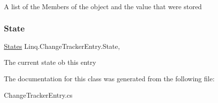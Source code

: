 A list of the Members of the object and the value that were stored 

\mbox{\label{class_linq_1_1_change_tracker_entry_ad24e8722ffd29eccfdcd3a72c97b1957}} 
\subsubsection{\texorpdfstring{State}{State}}
{\footnotesize\ttfamily \mbox{\hyperlink{class_linq_1_1_change_tracker_entry_aded3f97a3bd1326ae1b264c7618b7828}{States}} Linq.\+Change\+Tracker\+Entry.\+State\hspace{0.3cm}{\ttfamily [get]}, {\ttfamily [set]}}



The current state ob this entry 



The documentation for this class was generated from the following file\+:\begin{DoxyCompactItemize}
\item 
Change\+Tracker\+Entry.\+cs\end{DoxyCompactItemize}
